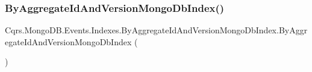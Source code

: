 \subsubsection{\texorpdfstring{By\+Aggregate\+Id\+And\+Version\+Mongo\+Db\+Index()}{ByAggregateIdAndVersionMongoDbIndex()}}
{\footnotesize\ttfamily Cqrs.\+Mongo\+D\+B.\+Events.\+Indexes.\+By\+Aggregate\+Id\+And\+Version\+Mongo\+Db\+Index.\+By\+Aggregate\+Id\+And\+Version\+Mongo\+Db\+Index (\begin{DoxyParamCaption}{ }\end{DoxyParamCaption})}

